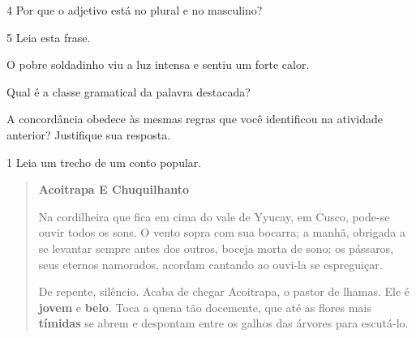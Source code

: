 \begin{escolha}
\begin{escolha}
\begin{escolha}
{\num{4} Por que o adjetivo está no plural e no masculino?


\num{5} Leia esta frase.

\begin{mdframed}[linewidth=10pt,linecolor=salmao!20,backgroundcolor=salmao!20,roundcorner=20pt]
O pobre soldadinho viu a luz intensa e sentiu um forte calor.
\end{mdframed}

\begin{escolha}
\item Qual é a classe gramatical da palavra destacada?


\item A concordância obedece às mesmas regras que você identificou na
  atividade anterior? Justifique sua resposta.

\end{escolha}


\num{1} Leia um trecho de um conto popular.

\begin{quote}
\textbf{Acoitrapa E Chuquilhanto}

Na cordilheira que fica em cima do vale de Yyucay, em Cusco,
pode-se ouvir todos os sons. O vento sopra com sua bocarra;
a manhã, obrigada a se levantar sempre antes dos outros,
boceja morta de sono; os pássaros, seus eternos namorados,
acordam cantando ao ouvi-la se espreguiçar.

De repente, silêncio. Acaba de chegar Acoitrapa, o
pastor de lhamas. Ele é \textbf{jovem} e \textbf{belo}. Toca a quena tão
docemente, que até as flores mais \textbf{tímidas} se abrem e
despontam entre os galhos das árvores para escutá-lo. 
\end{quote}


}
\end{escolha}
\end{escolha}
\end{escolha}
